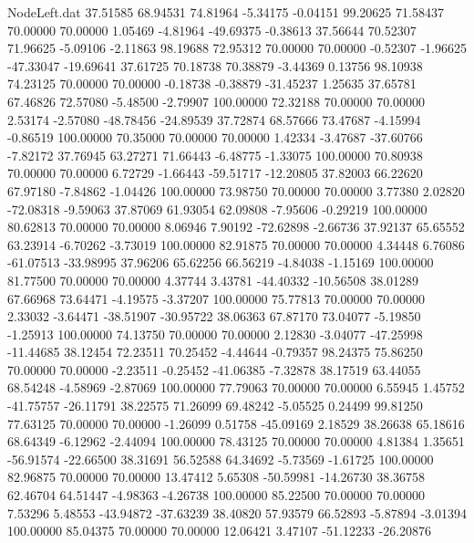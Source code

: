 \begin{filecontents}{NodeLeft.dat}
  37.51585   68.94531   74.81964    -5.34175   -0.04151   99.20625   71.58437   70.00000   70.00000    1.05469   -4.81964  -49.69375   -0.38613
  37.56644   70.52307   71.96625    -5.09106   -2.11863   98.19688   72.95312   70.00000   70.00000   -0.52307   -1.96625  -47.33047  -19.69641
  37.61725   70.18738   70.38879    -3.44369    0.13756   98.10938   74.23125   70.00000   70.00000   -0.18738   -0.38879  -31.45237    1.25635
  37.65781   67.46826   72.57080    -5.48500   -2.79907  100.00000   72.32188   70.00000   70.00000    2.53174   -2.57080  -48.78456  -24.89539
  37.72874   68.57666   73.47687    -4.15994   -0.86519  100.00000   70.35000   70.00000   70.00000    1.42334   -3.47687  -37.60766   -7.82172
  37.76945   63.27271   71.66443    -6.48775   -1.33075  100.00000   70.80938   70.00000   70.00000    6.72729   -1.66443  -59.51717  -12.20805
  37.82003   66.22620   67.97180    -7.84862   -1.04426  100.00000   73.98750   70.00000   70.00000    3.77380    2.02820  -72.08318   -9.59063
  37.87069   61.93054   62.09808    -7.95606   -0.29219  100.00000   80.62813   70.00000   70.00000    8.06946    7.90192  -72.62898   -2.66736
  37.92137   65.65552   63.23914    -6.70262   -3.73019  100.00000   82.91875   70.00000   70.00000    4.34448    6.76086  -61.07513  -33.98995
  37.96206   65.62256   66.56219    -4.84038   -1.15169  100.00000   81.77500   70.00000   70.00000    4.37744    3.43781  -44.40332  -10.56508
  38.01289   67.66968   73.64471    -4.19575   -3.37207  100.00000   75.77813   70.00000   70.00000    2.33032   -3.64471  -38.51907  -30.95722
  38.06363   67.87170   73.04077    -5.19850   -1.25913  100.00000   74.13750   70.00000   70.00000    2.12830   -3.04077  -47.25998  -11.44685
  38.12454   72.23511   70.25452    -4.44644   -0.79357   98.24375   75.86250   70.00000   70.00000   -2.23511   -0.25452  -41.06385   -7.32878
  38.17519   63.44055   68.54248    -4.58969   -2.87069  100.00000   77.79063   70.00000   70.00000    6.55945    1.45752  -41.75757  -26.11791
  38.22575   71.26099   69.48242    -5.05525    0.24499   99.81250   77.63125   70.00000   70.00000   -1.26099    0.51758  -45.09169    2.18529
  38.26638   65.18616   68.64349    -6.12962   -2.44094  100.00000   78.43125   70.00000   70.00000    4.81384    1.35651  -56.91574  -22.66500
  38.31691   56.52588   64.34692    -5.73569   -1.61725  100.00000   82.96875   70.00000   70.00000   13.47412    5.65308  -50.59981  -14.26730
  38.36758   62.46704   64.51447    -4.98363   -4.26738  100.00000   85.22500   70.00000   70.00000    7.53296    5.48553  -43.94872  -37.63239
  38.40820   57.93579   66.52893    -5.87894   -3.01394  100.00000   85.04375   70.00000   70.00000   12.06421    3.47107  -51.12233  -26.20876

\end{filecontents}
